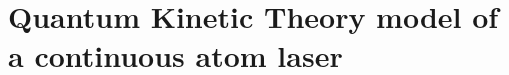 \chapter{Quantum Kinetic Theory model of a continuous atom laser}
\label{KineticTheory}
\graphicspath{{Figures/KineticTheory/}{Figures/Common/}}
